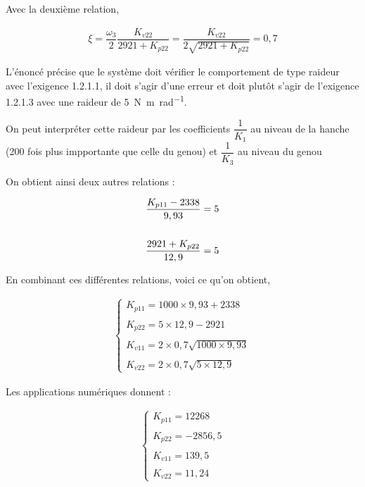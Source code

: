 \documentclass[11pt]{article}
\begin{document}
\begin{UPSTIcorrige}
Avec la deuxième relation,

\begin{align*}
\xi=\dfrac{\omega_3}{2}\dfrac{K_{v22}}{2921+K_{p22}}=\dfrac{K_{v22}}{2\sqrt{2921+K_{p22}}}=0,7
\end{align*}

L'énoncé précise que le système doit vérifier le comportement de type raideur avec l'exigence 1.2.1.1, il doit s'agir d'une erreur et doit plutôt s'agir de l'exigence 1.2.1.3 avec une raideur de \SI{5}{N.m.rad^{-1}}.

On peut interpréter cette raideur par les coefficients $\dfrac{1}{K_1}$ au niveau de la hanche (200 fois plus impportante que celle du genou) et $\dfrac{1}{K_3}$ au niveau du genou

On obtient ainsi deux autres relations : 

\begin{align*}
\dfrac{K_{p11}-2338}{9,93}=5\time 200\\
\\
\dfrac{2921+K_{p22}}{12,9}=5
\end{align*}

En combinant ces différentes relations, voici ce qu'on obtient,

\begin{align*}
\left\{
\begin{array}{l}
K_{p11}=1000\times 9,93+2338\\
\\
K_{p22}=5\times 12,9-2921\\
\\
K_{v11}=2\times 0,7\sqrt{1000\times 9,93}\\
\\
K_{v22}=2\times 0,7\sqrt{5\times 12,9}
\end{array}
\right.
\end{align*}

Les applications numériques donnent : 


\begin{align*}
\left\{
\begin{array}{l}
K_{p11}=12268 \\
\\
K_{p22}=-2856,5 \\
\\
K_{v11}=139,5\\
\\
K_{v22}=11,24
\end{array}
\right.
\end{align*}


\end{UPSTIcorrige}
\end{document}
